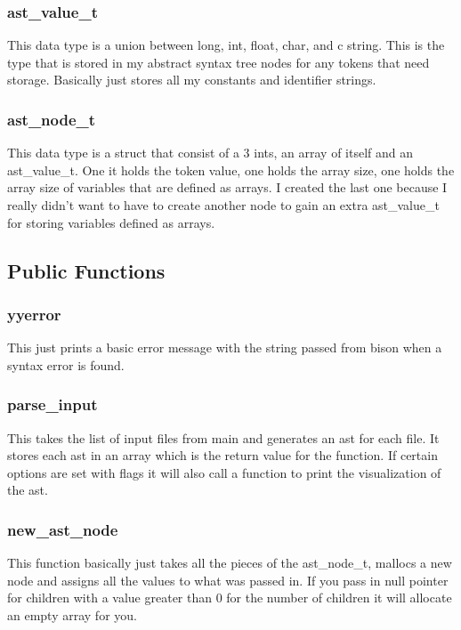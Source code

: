 \documentclass[11pt]{article}
\begin{document}
            \subsubsection{ast\_value\_t}
                This data type is a union between long, int, float, char, and c string. This is the type that is stored in my abstract syntax tree 
                nodes for any tokens that need storage. Basically just stores all my constants and identifier strings.

            \subsubsection{ast\_node\_t}
                This data type is a struct that consist of a 3 ints, an array of itself and an ast\_value\_t. One it holds the token value, one holds the array size, 
                one holds the array size of variables that are defined as arrays. I created the last one because I really didn't want to have to create another node 
                to gain an extra ast\_value\_t for storing variables defined as arrays.

        \subsection{Public Functions}

            \subsubsection{yyerror}
                This just prints a basic error message with the string passed from bison when a syntax error is found.

            \subsubsection{parse\_input}
                This takes the list of input files from main and generates an ast for each file. It stores each ast in an array which 
                is the return value for the function. If certain options are set with flags it will also call a function to print
                the visualization of the ast.

            \subsubsection{new\_ast\_node}
                This function basically just takes all the pieces of the ast\_node\_t, mallocs a new node and assigns all the values to what was passed in.
                If you pass in null pointer for children with a value greater than 0 for the number of children it will allocate an empty array for you.
\end{document}

